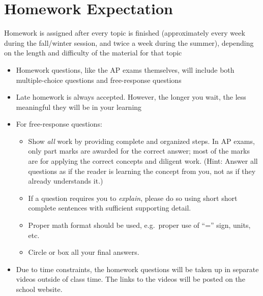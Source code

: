 \documentclass{../../oss-handout}
\begin{document}
\section*{Homework Expectation}
Homework is assigned after every topic is finished (approximately every
week during the fall/winter session, and twice a week during the summer),
depending on the length and difficulty of the material for that topic
\begin{itemize}[nosep,leftmargin=15pt]
\item Homework questions, like the AP exams themselves, will include both
  multiple-choice questions and free-response questions
\item Late homework is always accepted. However, the longer you wait, the less
  meaningful they will be in your learning
\item For free-response questions:
  \begin{itemize}[nosep,leftmargin=15pt]
  \item Show \emph{all} work by providing complete and organized steps. In AP
    exams, only part marks are awarded for the correct answer; most of the
    marks are for applying the correct concepts and diligent work. (Hint:
    Answer all questions as if the reader is learning the concept from you, not
    as if they already understands it.)
  \item If a question requires you to \emph{explain}, please do so using
    short short complete sentences with sufficient supporting detail.
  \item Proper math format should be used, e.g.\ proper use of ``='' sign,
    units, etc.
  \item Circle or box all your final answers.
  \end{itemize}
\item Due to time constraints, the homework questions will be taken up in
  separate videos outside of class time. The links to the videos will be posted
  on the school website.
\end{itemize}
%
%
\end{document}
